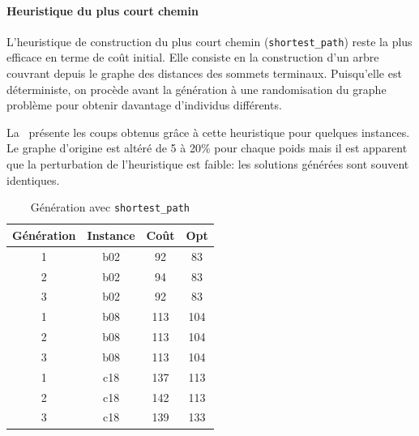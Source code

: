 \documentclass[10pt]{article}
\begin{document}
		\paragraph{Heuristique du plus court chemin}{
			L'heuristique de construction du plus court chemin (\texttt{shortest\_path}) reste la plus efficace en terme de coût initial. Elle consiste en la construction d'un arbre couvrant depuis le graphe des distances des sommets terminaux. Puisqu'elle est déterministe, on procède avant la génération à une randomisation du graphe problème pour obtenir davantage d'individus différents.
		
		La~ présente les coups obtenus grâce à cette heuristique pour quelques instances. Le graphe d'origine est altéré de 5 à 20\% pour chaque poids mais il est apparent que la perturbation de l'heuristique est faible: les solutions générées sont souvent identiques.
		
		\begin{table}[h!]
				\centering
				\begin{tabular}{|c|c|c|c|}
					\hline
					\textbf{Génération} & \textbf{Instance} & \textbf{Coût} & \textbf{Opt} \\
					\hline
					1 & b02  & 92 & 83 \\
					2 & b02  & 94 & 83 \\
					3 & b02  & 92 & 83 \\
					1 & b08  & 113 & 104 \\
					2 & b08  & 113 & 104 \\
					3 & b08  & 113 & 104 \\
					1 & c18  & 137 & 113 \\
					2 & c18  & 142 & 113 \\
					3 & c18  & 139 & 133 \\
					\hline
				\end{tabular}
				\caption{Génération avec \texttt{shortest\_path}}
				\label{tab-spinit}
			\end{table}
		}
\end{document}
